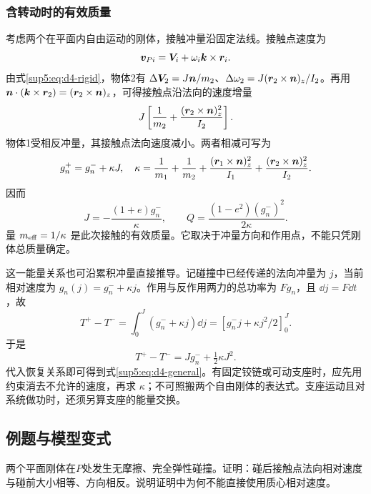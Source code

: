 \subsubsection{含转动时的有效质量}
考虑两个在平面内自由运动的刚体，接触冲量沿固定法线。接触点速度为
\begin{equation}
 \bm{v}_{Pi}=\bm{V}_i+\omega_i\bm{k}\times\bm{r}_i.
\end{equation}
由式\eqref{sup5:eq:d4-rigid}，物体2有 $\Delta\bm{V}_2=J\bm{n}/m_2$、$\Delta\omega_2=J(\bm{r}_2\times\bm{n})_z/I_2$。再用 $\bm{n}\cdot(\bm{k}\times\bm{r}_2)=(\bm{r}_2\times\bm{n})_z$，可得接触点沿法向的速度增量
\begin{equation}
 J\left[\frac1{m_2}+\frac{(\bm{r}_2\times\bm{n})_z^2}{I_2}\right].
\end{equation}
物体1受相反冲量，其接触点法向速度减小。两者相减可写为
\begin{equation}\label{sup5:eq:d4-kappa}
 g_n^+=g_n^-+\kappa J,\quad
 \kappa=\frac1{m_1}+\frac1{m_2}
 +\frac{(\bm{r}_1\times\bm{n})_z^2}{I_1}
 +\frac{(\bm{r}_2\times\bm{n})_z^2}{I_2}.
\end{equation}
因而
\begin{equation}\label{sup5:eq:d4-general}
 J=-\frac{(1+e)g_n^-}{\kappa},\qquad
 Q=\frac{(1-e^2)(g_n^-)^2}{2\kappa}.
\end{equation}
量 $m_{\rm eff}=1/\kappa$ 是此次接触的有效质量。它取决于冲量方向和作用点，不能只凭刚体总质量确定。

这一能量关系也可沿累积冲量直接推导。记碰撞中已经传递的法向冲量为 $j$，当前相对速度为 $g_n(j)=g_n^-+\kappa j$。作用与反作用两力的总功率为 $Fg_n$，且 $\dd j=F\dd t$，故
\[
T^+-T^-=\int_0^J(g_n^-+\kappa j)\dd j
=[g_n^-j+\kappa j^2/2]_0^J.
\]
于是
\begin{equation}
 T^+-T^-=Jg_n^-+\tfrac12\kappa J^2.
\end{equation}
代入恢复关系即可得到式\eqref{sup5:eq:d4-general}。有固定铰链或可动支座时，应先用约束消去不允许的速度，再求 $\kappa$；不可照搬两个自由刚体的表达式。支座运动且对系统做功时，还须另算支座的能量交换。


\subsection{例题与模型变式}

\begin{example}[刚体弹性碰撞的法向相对速度]\label{ex:hw5-1}

两个平面刚体在$P$处发生无摩擦、完全弹性碰撞。证明：碰后接触点法向相对速度与碰前大小相等、方向相反。说明证明中为何不能直接使用质心相对速度。

\end{example}


